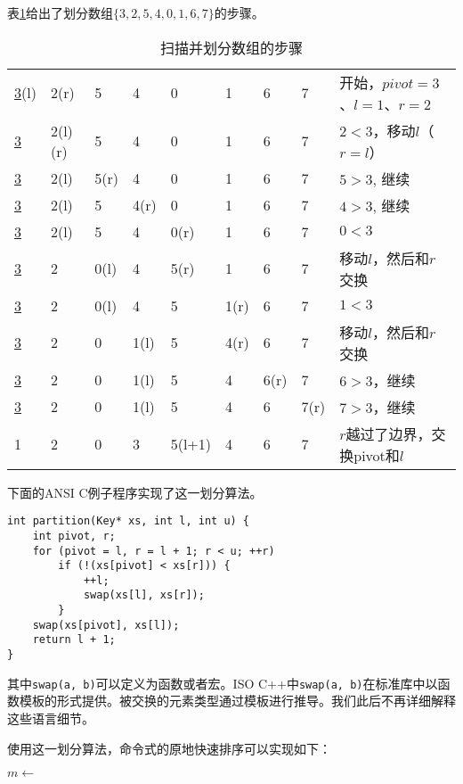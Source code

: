 \documentclass[UTF8]{article}
\begin{document}
表\ref{tab:partition-steps}给出了划分数组$\{ 3, 2, 5, 4, 0, 1, 6, 7\}$的步骤。

\begin{table}[htbp]
\centering
\begin{tabular}{|llllllll|l|}
\hline
\underline{3}(l)  & 2(r) & 5 & 4 & 0 & 1 & 6 & 7 & 开始，$pivot = 3$、$l = 1$、$r = 2$ \\
\underline{3} & 2(l)(r) & 5 & 4 & 0 & 1 & 6 & 7 & $2 < 3$，移动$l$（$r=l$）\\
\underline{3} & 2(l) & 5(r) & 4 & 0 & 1 & 6 & 7 & $5 > 3$, 继续 \\
\underline{3} & 2(l) & 5 & 4(r) & 0 & 1 & 6 & 7 & $4 > 3$, 继续 \\
\underline{3} & 2(l) & 5 & 4 & 0(r) & 1 & 6 & 7 & $0 < 3$ \\
\underline{3} & 2 & 0(l) & 4 & 5(r) & 1 & 6 & 7 & 移动$l$，然后和$r$交换 \\
\underline{3} & 2 & 0(l) & 4 & 5 & 1(r) & 6 & 7 & $1 < 3$ \\
\underline{3} & 2 & 0 & 1(l) & 5 & 4(r) & 6 & 7 & 移动$l$，然后和$r$交换 \\
\underline{3} & 2 & 0 & 1(l) & 5 & 4 & 6(r) & 7 & $6 > 3$，继续 \\
\underline{3} & 2 & 0 & 1(l) & 5 & 4 & 6 & 7(r) & $7 > 3$，继续 \\
1 & 2 & 0 & 3 & 5(l+1) & 4 & 6 & 7 & $r$越过了边界，交换pivot和$l$ \\
\hline
\end{tabular}
\caption{扫描并划分数组的步骤} \label{tab:partition-steps}
\end{table}

下面的ANSI C例子程序实现了这一划分算法。

\lstset{language=C}
\begin{lstlisting}
int partition(Key* xs, int l, int u) {
    int pivot, r;
    for (pivot = l, r = l + 1; r < u; ++r)
        if (!(xs[pivot] < xs[r])) {
            ++l;
            swap(xs[l], xs[r]);
        }
    swap(xs[pivot], xs[l]);
    return l + 1;
}
\end{lstlisting}

其中\texttt{swap(a, b)}可以定义为函数或者宏。ISO C++中\texttt{swap(a, b)}在标准库中以函数模板的形式提供。被交换的元素类型通过模板进行推导。我们此后不再详细解释这些语言细节。

使用这一划分算法，命令式的原地快速排序可以实现如下：

\begin{algorithmic}[1]
    \State $m \gets$ 
    \State {}
    \State {}
  \EndIf
\EndProcedure
\end{algorithmic}
\end{document}
